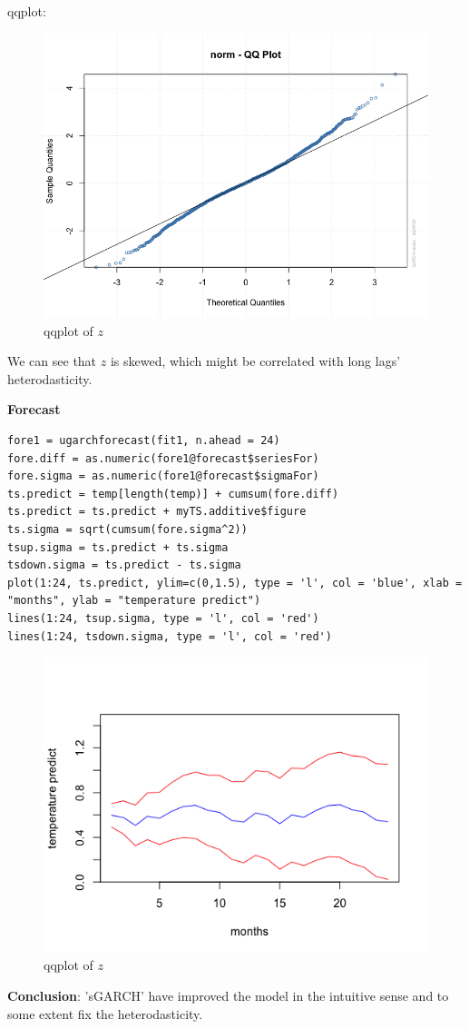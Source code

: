 \documentclass[a4paper, 11pt]{article}
\begin{document}
qqplot:
\begin{figure}[H]
\centering
\caption{qqplot of $z$}
\includegraphics[scale=.60]{qqplot.png}
\end{figure}

\indent We can see that $z$ is skewed, which might be correlated with long lags' heterodasticity.\par

\textbf{Forecast}

\begin{verbatim}
fore1 = ugarchforecast(fit1, n.ahead = 24)
fore.diff = as.numeric(fore1@forecast$seriesFor)
fore.sigma = as.numeric(fore1@forecast$sigmaFor)
ts.predict = temp[length(temp)] + cumsum(fore.diff)
ts.predict = ts.predict + myTS.additive$figure
ts.sigma = sqrt(cumsum(fore.sigma^2))
tsup.sigma = ts.predict + ts.sigma
tsdown.sigma = ts.predict - ts.sigma
plot(1:24, ts.predict, ylim=c(0,1.5), type = 'l', col = 'blue', xlab = "months", ylab = "temperature predict")
lines(1:24, tsup.sigma, type = 'l', col = 'red')
lines(1:24, tsdown.sigma, type = 'l', col = 'red')
\end{verbatim}

\begin{figure}[H]
\centering
\caption{qqplot of $z$}
\includegraphics[scale=.60]{predict01.png}
\end{figure}


\textbf{Conclusion}: 'sGARCH' have improved the model in the intuitive sense and to some extent fix the heterodasticity. 
\end{document}
